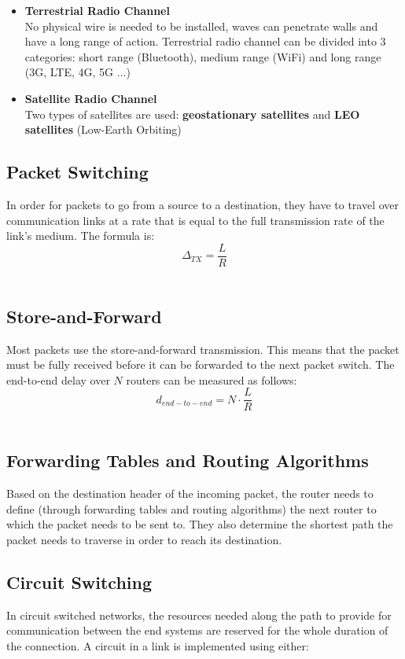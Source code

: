 \documentclass{article}
\begin{document}
\begin{itemize}
	\item \textbf{Terrestrial Radio Channel}
	\vspace{.2cm} \\
	No physical wire is needed to be installed, waves can penetrate walls and have a long range of action. Terrestrial radio channel can be divided into 3 categories: short range (Bluetooth), medium range (WiFi) and long range (3G, LTE, 4G, 5G ...)
	
	\item \textbf{Satellite Radio Channel}
	\vspace{.2cm} \\
	Two types of satellites are used: \textbf{geostationary satellites} and \textbf{LEO satellites} (Low-Earth Orbiting)
\end{itemize}

\subsection{Packet Switching}
In order for packets to go from a source to a destination, they have to travel over communication links at a rate that is equal to the full transmission rate of the link's medium. The formula is: \\

	\[ \Delta_{TX} = \frac{L}{R} \] \
	
\subsection{Store-and-Forward}
Most packets use the store-and-forward transmission. This means that the packet must be fully received before it can be forwarded to the next packet switch. The end-to-end delay over $N$ routers can be measured as follows: \\

	\[ d_{end-to-end} = N \cdot \frac{L}{R} \] \
	
\subsection{Forwarding Tables and Routing Algorithms}
Based on the destination header of the incoming packet, the router needs to define (through forwarding tables and routing algorithms) the next router to which the packet needs to be sent to. They also determine the shortest path the packet needs to traverse in order to reach its destination.

\subsection{Circuit Switching}
In circuit switched networks, the resources needed along the path to provide for communication between the end systems are reserved for the whole duration of the connection. A circuit in a link is implemented using either:
\end{document}
